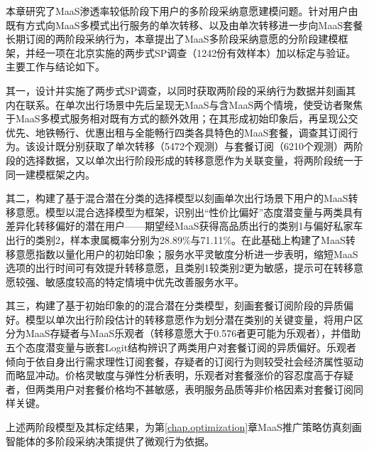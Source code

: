 本章研究了MaaS渗透率较低阶段下用户的多阶段采纳意愿建模问题。针对用户由既有方式向MaaS多模式出行服务的单次转移、以及由单次转移进一步向MaaS套餐长期订阅的两阶段采纳行为，本章提出了MaaS多阶段采纳意愿的分阶段建模框架，并经一项在北京实施的两步式SP调查（1242份有效样本）加以标定与验证。主要工作与结论如下。

其一，设计并实施了两步式SP调查，以同时获取两阶段的采纳行为数据并刻画其内在联系。在单次出行场景中先后呈现无MaaS与含MaaS两个情境，使受访者聚焦于MaaS多模式服务相对既有方式的额外效用；在其形成初始印象后，再呈现公交优先、地铁畅行、优惠出租与全能畅行四类各具特色的MaaS套餐，调查其订阅行为。该设计既分别获取了单次转移（5472个观测）与套餐订阅（6210个观测）两阶段的选择数据，又以单次出行阶段形成的转移意愿作为关联变量，将两阶段统一于同一建模框架之内。

其二，构建了基于混合潜在分类的选择模型以刻画单次出行场景下用户的MaaS转移意愿。模型以混合选择模型为框架，识别出``性价比偏好''态度潜变量与两类具有差异化转移偏好的潜在用户——期望经MaaS获得高品质出行的类别1与偏好私家车出行的类别2，样本隶属概率分别为28.89\%与71.11\%。在此基础上构建了MaaS转移意愿指数以量化用户的初始印象；服务水平灵敏度分析进一步表明，缩短MaaS选项的出行时间可有效提升转移意愿，且类别1较类别2更为敏感，提示可在转移意愿较强、敏感度较高的特定情境中优先改善服务水平。

其三，构建了基于初始印象的的混合潜在分类模型，刻画套餐订阅阶段的异质偏好。模型以单次出行阶段估计的转移意愿作为划分潜在类别的关键变量，将用户区分为MaaS存疑者与MaaS乐观者（转移意愿大于0.576者更可能为乐观者），并借助五个态度潜变量与嵌套Logit结构辨识了两类用户对套餐订阅的异质偏好。乐观者倾向于依自身出行需求理性订阅套餐，存疑者的订阅行为则较受社会经济属性驱动而略显冲动。价格灵敏度与弹性分析表明，乐观者对套餐涨价的容忍度高于存疑者，但两类用户对套餐价格均不甚敏感，表明服务品质等非价格因素对套餐订阅同样关键。

上述两阶段模型及其标定结果，为第\ref{chap.optimization}章MaaS推广策略仿真刻画智能体的多阶段采纳决策提供了微观行为依据。
